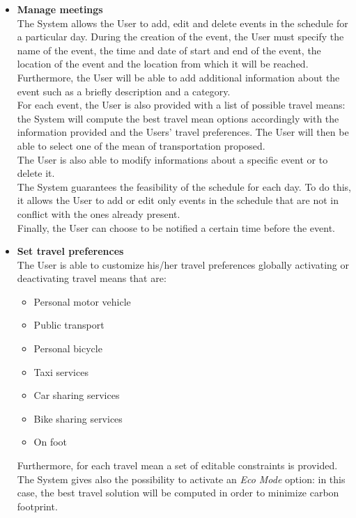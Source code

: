 \begin{itemize}
	\item \textbf{Manage meetings}\\
	The System allows the User to add, edit and delete events in the schedule for a particular day. During the creation of the event, the User must specify the name of the event, the time and date of start and end of the event, the location of the event and the location from which it will be reached. Furthermore, the User will be able to add additional information about the event such as a briefly description and a category.\\
	For each event, the User is also provided with a list of possible travel means: the System will compute the best travel mean options accordingly with the information provided and the Users' travel preferences. The User will then be able to select one of the mean of transportation proposed.\\
	The User is also able to modify informations about a specific event or to delete it.\\
	The System guarantees the feasibility of the schedule for each day. To do this, it allows the User to add or edit only events in the schedule that are not in conflict with the ones already present.\\
	Finally, the User can choose to be notified a certain time before the event.
	
	
	\item \textbf{Set travel preferences}\\
	The User is able to customize his/her travel preferences globally activating or deactivating travel means that are:
	\begin{itemize}
		\item Personal motor vehicle
		\item Public transport
		\item Personal bicycle
		\item Taxi services
		\item Car sharing services
		\item Bike sharing services
		\item On foot
	\end{itemize} 
	Furthermore, for each travel mean a set of editable constraints is provided. The System gives also the possibility to activate an \textit{Eco Mode} option: in this case, the best travel solution will be computed in order to minimize carbon footprint.
	

\end{itemize}

